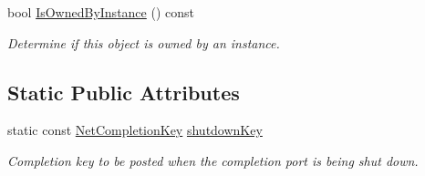 \begin{DoxyCompactItemize}
bool \hyperlink{class_net_completion_key_a6e8238da31dd59e20cdd0393c7a93ee0}{IsOwnedByInstance} () const 
\begin{DoxyCompactList}\small\item\em Determine if this object is owned by an instance. \item\end{DoxyCompactList}\end{DoxyCompactItemize}
\subsection*{Static Public Attributes}
\begin{DoxyCompactItemize}
\item 
\hypertarget{class_net_completion_key_ac2b30c2b2c9c5820eb68a5d1bb226a5b}{
static const \hyperlink{class_net_completion_key}{NetCompletionKey} \hyperlink{class_net_completion_key_ac2b30c2b2c9c5820eb68a5d1bb226a5b}{shutdownKey}}
\label{class_net_completion_key_ac2b30c2b2c9c5820eb68a5d1bb226a5b}

\begin{DoxyCompactList}\small\item\em Completion key to be posted when the completion port is being shut down. \item\end{DoxyCompactList}\end{DoxyCompactItemize}
